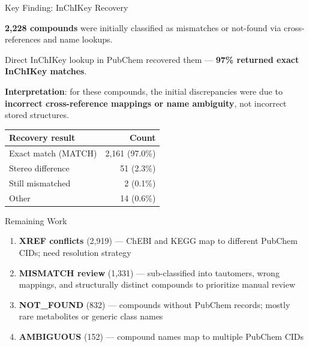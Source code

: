 \documentclass[aspectratio=169,11pt]{beamer}
\begin{document}
\begin{frame}{Key Finding: InChIKey Recovery}

\textbf{2,228 compounds} were initially classified as mismatches or
not-found via cross-references and name lookups.

\bigskip
Direct InChIKey lookup in PubChem recovered them ---
\textbf{97\% returned exact InChIKey matches}.

\bigskip
\textbf{Interpretation}: for these compounds, the initial discrepancies
were due to \textbf{incorrect cross-reference mappings or name ambiguity},
not incorrect stored structures.

\bigskip
\begin{table}[h]
\centering
\small
\begin{tabular}{lr}
\toprule
\textbf{Recovery result} & \textbf{Count} \\
\midrule
Exact match (MATCH)   & 2,161 (97.0\%) \\
Stereo difference     &    51 (2.3\%) \\
Still mismatched      &     2 (0.1\%) \\
Other                 &    14 (0.6\%) \\
\bottomrule
\end{tabular}
\end{table}

\end{frame}

\begin{frame}{Remaining Work}

\begin{enumerate}\setlength\itemsep{8pt}
  \item \textbf{XREF conflicts} (2,919) --- ChEBI and KEGG map to
        different PubChem CIDs; need resolution strategy
  \item \textbf{MISMATCH review} (1,331) --- sub-classified into
        tautomers, wrong mappings, and structurally distinct compounds
        to prioritize manual review
  \item \textbf{NOT\_FOUND} (832) --- compounds without PubChem
        records; mostly rare metabolites or generic class names
  \item \textbf{AMBIGUOUS} (152) --- compound names map to multiple
        PubChem CIDs
\end{enumerate}

\end{frame}
\end{document}
